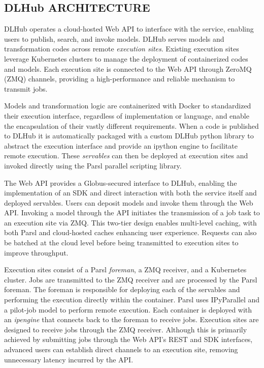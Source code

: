 \documentclass{aip-cp}
\begin{document}
\subsection{DLHub ARCHITECTURE}
DLHub operates a cloud-hosted Web API to interface with the 
service, enabling users to publish, search, and invoke models. DLHub serves models and 
transformation codes across remote \textit{execution 
sites}. Existing execution sites leverage Kubernetes clusters to manage the deployment of 
containerized codes and models. Each execution site is connected to the Web API 
through ZeroMQ (ZMQ) channels, providing a high-performance and reliable mechanism to transmit 
jobs. 

Models and transformation logic are containerized with Docker to standardized their execution 
interface, regardless of implementation or language, and enable the encapsulation of their vastly 
different requirements. When a code is published to DLHub it is automatically packaged with 
a custom DLHub python library to abstract the execution interface and provide an ipython engine to 
facilitate remote execution. These \textit{servables} can then be deployed at execution sites 
and invoked directly using the Parsl parallel scripting library.

The Web API provides a Globus-secured interface to DLHub, enabling the implementation 
of an SDK and direct interaction with both the service itself and deployed servables. Users can 
deposit models and invoke them through the Web API. Invoking a model through the API initiates the 
transmission of a job task to an execution site via ZMQ. This two-tier design enables multi-level 
caching, with both Parsl and cloud-hosted caches enhancing user experience. Requests can also be 
batched at the cloud level before being transmitted to execution sites to improve throughput.

Execution sites consist of a Parsl \textit{foreman}, a ZMQ receiver, and a Kubernetes cluster. Jobs 
are transmitted to the ZMQ receiver and are processed by the Parsl foreman. The foreman is 
responsible for deploying each of the servables and 
performing the execution directly within the container. Parsl uses IPyParallel and a pilot-job 
model to perform remote execution. Each container is deployed with an \textit{ipengine} that 
connects back to the foreman to receive jobs. Execution sites are designed to receive jobs through 
the ZMQ receiver. Although this is primarily achieved by submitting jobs through the Web API's REST 
and SDK interfaces, advanced users can establish direct channels to an execution site, removing 
unnecessary latency incurred by the API.
\end{document}
